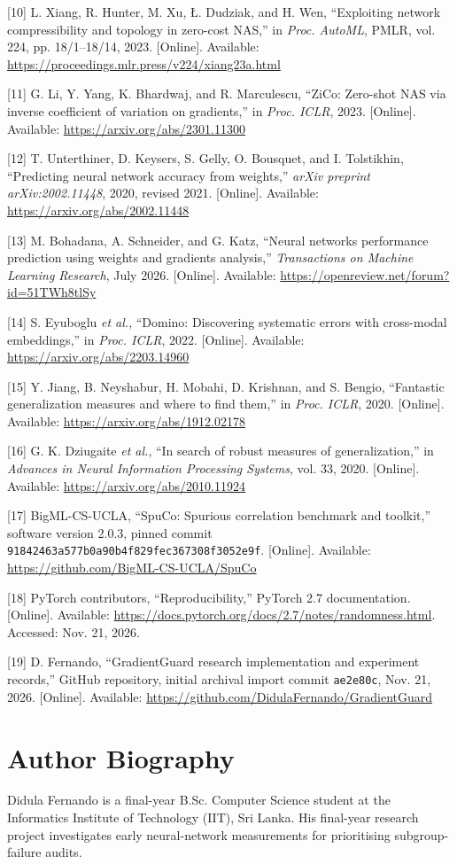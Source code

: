 [10]  L. Xiang, R. Hunter, M. Xu, \L{}. Dudziak, and H. Wen, ``Exploiting network compressibility and topology in zero-cost NAS,'' in \emph{Proc. AutoML}, PMLR, vol. 224, pp. 18/1--18/14, 2023. [Online]. Available: \url{https://proceedings.mlr.press/v224/xiang23a.html}

[11]  G. Li, Y. Yang, K. Bhardwaj, and R. Marculescu, ``ZiCo: Zero-shot NAS via inverse coefficient of variation on gradients,'' in \emph{Proc. ICLR}, 2023. [Online]. Available: \url{https://arxiv.org/abs/2301.11300}

[12]  T. Unterthiner, D. Keysers, S. Gelly, O. Bousquet, and I. Tolstikhin, ``Predicting neural network accuracy from weights,'' \emph{arXiv preprint arXiv:2002.11448}, 2020, revised 2021. [Online]. Available: \url{https://arxiv.org/abs/2002.11448}

[13]  M. Bohadana, A. Schneider, and G. Katz, ``Neural networks performance prediction using weights and gradients analysis,'' \emph{Transactions on Machine Learning Research}, July 2026. [Online]. Available: \url{https://openreview.net/forum?id=51TWh8tlSy}

[14]  S. Eyuboglu \emph{et al.}, ``Domino: Discovering systematic errors with cross-modal embeddings,'' in \emph{Proc. ICLR}, 2022. [Online]. Available: \url{https://arxiv.org/abs/2203.14960}

[15]  Y. Jiang, B. Neyshabur, H. Mobahi, D. Krishnan, and S. Bengio, ``Fantastic generalization measures and where to find them,'' in \emph{Proc. ICLR}, 2020. [Online]. Available: \url{https://arxiv.org/abs/1912.02178}

[16]  G. K. Dziugaite \emph{et al.}, ``In search of robust measures of generalization,'' in \emph{Advances in Neural Information Processing Systems}, vol. 33, 2020. [Online]. Available: \url{https://arxiv.org/abs/2010.11924}

[17]  BigML-CS-UCLA, ``SpuCo: Spurious correlation benchmark and toolkit,'' software version 2.0.3, pinned commit \texttt{91842463a577b0a90b4f829fec367308f3052e9f}. [Online]. Available: \url{https://github.com/BigML-CS-UCLA/SpuCo}

[18]  PyTorch contributors, ``Reproducibility,'' PyTorch 2.7 documentation. [Online]. Available: \url{https://docs.pytorch.org/docs/2.7/notes/randomness.html}. Accessed: Nov. 21, 2026.

[19]  D. Fernando, ``GradientGuard research implementation and experiment records,'' GitHub repository, initial archival import commit \texttt{ae2e80c}, Nov. 21, 2026. [Online]. Available: \url{https://github.com/DidulaFernando/GradientGuard}





\section*{Author Biography}
Didula Fernando is a final-year B.Sc. Computer Science student at the Informatics Institute of Technology (IIT), Sri Lanka. His final-year research project investigates early neural-network measurements for prioritising subgroup-failure audits.
